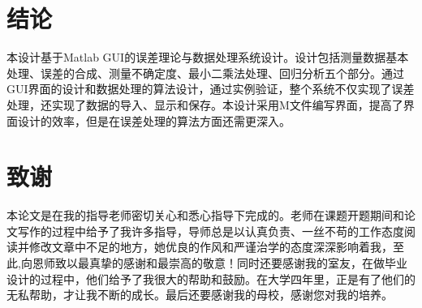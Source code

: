 \part*{结论}
本设计基于Matlab GUI的误差理论与数据处理系统设计。设计包括测量数据基本处理、误差的合成、测量不确定度、最小二乘法处理、回归分析五个部分。通过GUI界面的设计和数据处理的算法设计，通过实例验证，整个系统不仅实现了误差处理，还实现了数据的导入、显示和保存。本设计采用M文件编写界面，提高了界面设计的效率，但是在误差处理的算法方面还需更深入。

\part*{致谢}
本论文是在我的指导老师密切关心和悉心指导下完成的。老师在课题开题期间和论文写作的过程中给予了我许多指导，导师总是以认真负责、一丝不苟的工作态度阅读并修改文章中不足的地方，她优良的作风和严谨治学的态度深深影响着我，至此,向恩师致以最真挚的感谢和最崇高的敬意！同时还要感谢我的室友，在做毕业设计的过程中，他们给予了我很大的帮助和鼓励。在大学四年里，正是有了他们的无私帮助，才让我不断的成长。最后还要感谢我的母校，感谢您对我的培养。